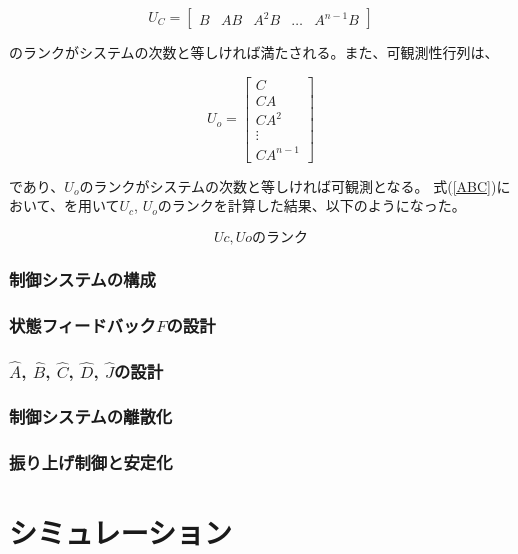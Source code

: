 \documentclass[a4j,11pt,twoside]{jbook}
\begin{document}
$$
    U_{C} =
    \left[
        \begin{array}{ccccc}
            B  &  AB  &  A^2B  &  \dots  &  A^{n-1}B
        \end{array}
    \right]
$$

のランクがシステムの次数と等しければ満たされる。また、可観測性行列は、

$$
    U_{o} = 
    \left[
        \begin{array}{c}
            C \\
            CA \\
            CA^2 \\
            \vdots \\
            CA^{n-1}
        \end{array}
    \right]
$$

であり、$U_{o}$のランクがシステムの次数と等しければ可観測となる。
式(\ref{ABC})において、\MaTX{}を用いて$U_{c}$, $U_{o}$のランクを計算した結果、以下のようになった。

$$
    Uc, Uoのランク
$$

\subsection{制御システムの構成}

\subsection{状態フィードバック$F$の設計}

\subsection{$\hat{A}$, $\hat{B}$, $\hat{C}$, $\hat{D}$, $\hat{J}$の設計}

\subsection{制御システムの離散化}

\subsection{振り上げ制御と安定化}




\chapter{シミュレーション}
\end{document}
